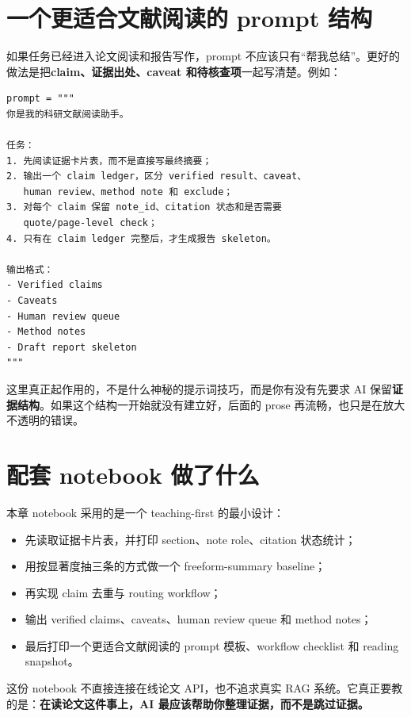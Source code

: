 \section{一个更适合文献阅读的 prompt 结构}

如果任务已经进入论文阅读和报告写作，prompt 不应该只有“帮我总结”。更好的做法是把\textbf{claim、证据出处、caveat 和待核查项}一起写清楚。例如：

\begin{examplebox}
\begin{lstlisting}[style=pythonstyle]
prompt = """
你是我的科研文献阅读助手。

任务：
1. 先阅读证据卡片表，而不是直接写最终摘要；
2. 输出一个 claim ledger，区分 verified result、caveat、
   human review、method note 和 exclude；
3. 对每个 claim 保留 note_id、citation 状态和是否需要
   quote/page-level check；
4. 只有在 claim ledger 完整后，才生成报告 skeleton。

输出格式：
- Verified claims
- Caveats
- Human review queue
- Method notes
- Draft report skeleton
"""
\end{lstlisting}
\end{examplebox}

这里真正起作用的，不是什么神秘的提示词技巧，而是你有没有先要求 AI 保留\textbf{证据结构}。如果这个结构一开始就没有建立好，后面的 prose 再流畅，也只是在放大不透明的错误。

\section{配套 notebook 做了什么}

本章 notebook 采用的是一个 teaching-first 的最小设计：

\begin{itemize}
    \item 先读取证据卡片表，并打印 section、note role、citation 状态统计；
    \item 用按显著度抽三条的方式做一个 freeform-summary baseline；
    \item 再实现 claim 去重与 routing workflow；
    \item 输出 verified claims、caveats、human review queue 和 method notes；
    \item 最后打印一个更适合文献阅读的 prompt 模板、workflow checklist 和 reading snapshot。
\end{itemize}

这份 notebook 不直接连接在线论文 API，也不追求真实 RAG 系统。它真正要教的是：\textbf{在读论文这件事上，AI 最应该帮助你整理证据，而不是跳过证据。}


